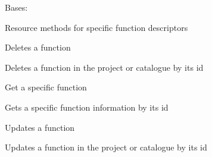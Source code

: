 \documentclass[letterpaper,10pt,english]{sphinxmanual}
\begin{document}
\begin{fulllineitems}
\label{_source/son_editor.apis:son_editor.apis.catalogue_functionsapi.Function}
Bases: 

Resource methods for specific function descriptors

\begin{fulllineitems}
\label{_source/son_editor.apis:son_editor.apis.catalogue_functionsapi.Function.delete}
Deletes a  function

Deletes a function in the project or catalogue by its id

\end{fulllineitems}


\begin{fulllineitems}
\label{_source/son_editor.apis:son_editor.apis.catalogue_functionsapi.Function.get}
Get a specific function

Gets a specific function information by its id

\end{fulllineitems}


\begin{fulllineitems}
\label{_source/son_editor.apis:son_editor.apis.catalogue_functionsapi.Function.methods}
\end{fulllineitems}


\begin{fulllineitems}
\label{_source/son_editor.apis:son_editor.apis.catalogue_functionsapi.Function.put}
Updates a function

Updates a function in the project or catalogue by its id

\end{fulllineitems}


\end{fulllineitems}
\end{document}
